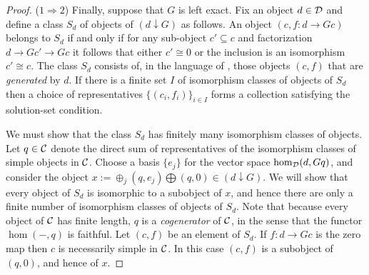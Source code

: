 \documentclass{amsart}
\begin{document}
\begin{proof}
($1 \Rightarrow 2$) Finally, suppose that $G$ is left exact. Fix an object $d \in \mathcal D$ and define a class $S_d$ of objects of $(d \downarrow G)$ as follows. An object $(c, f:d \to G c)$ belongs to $S_d$ if and only if for any sub-object $c' \subseteq c$ and factorization $d \to G c' \to G c$ it follows that either $c' \cong 0$ or the inclusion is an isomorphism $c' \cong c$.   The class $S_d$ consists of, in the language of \cite[Ex. 3-J]{MR0166240}, those objects $(c,f)$ that are {\em generated} by $d$. If there is a finite set $I$ of isomorphism classes of objects of $S_d$ then a choice of representatives $\{(c_i, f_i)\}_{i \in I}$ forms a collection satisfying the solution-set condition.   

We must show that the class $S_d$ has finitely many isomorphism classes of objects. Let $q \in \mathcal C$ denote the direct sum of representatives of the isomorphism classes of simple objects in $\mathcal C$. Choose a basis $\{e_j\}$ for the vector space $\hom_{\mathcal D}(d, G q)$, and consider the object $x := \oplus_j( q, e_j) \bigoplus (q,0) \in (d \downarrow G)$. We will show that every object of $S_d$ is isomorphic to a subobject of $x$, and hence there are only a finite number of isomorphism classes of objects of $S_d$. Note that because every object of $\mathcal C$ has finite length, $q$ is a {\em cogenerator} of $\mathcal C$, in the sense that the functor $\hom(-, q)$ is faithful. Let $(c, f)$ be an element of $S_d$. If $f: d \to G c$ is the zero map then $c$ is necessarily simple in $\mathcal C$. In this case $(c, f)$ is a subobject of $(q, 0)$, and hence of $x$. 


\end{proof}
\end{document}
